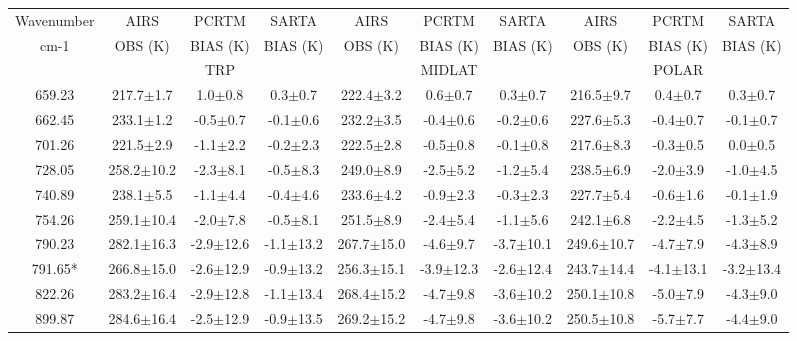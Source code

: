 \documentclass[agupp]{aguplus}              %
\begin{document}
\begin{article}
\begin{center}
\begin{table}[ht]
{\footnotesize
\hfill{}
\begin{tabular}{c|ccc|ccc|ccc} %
Wavenumber & AIRS   & PCRTM    & SARTA    & AIRS   & PCRTM    & SARTA    & AIRS   & PCRTM    & SARTA \\
cm-1       & OBS (K)& BIAS (K) & BIAS (K) & OBS (K)& BIAS (K) & BIAS (K) & OBS (K)& BIAS (K) & BIAS (K) \\
           &        & TRP      &          &        & MIDLAT   &          &        & POLAR    &       \\
\hline
659.23 & 217.7$\pm$1.7 &  1.0$\pm$0.8 &  0.3$\pm$0.7 & 222.4$\pm$3.2 &  0.6$\pm$0.7 &  0.3$\pm$0.7 & 216.5$\pm$9.7 &  0.4$\pm$0.7 &  0.3$\pm$0.7 \\ 
662.45 & 233.1$\pm$1.2 & -0.5$\pm$0.7 & -0.1$\pm$0.6 & 232.2$\pm$3.5 & -0.4$\pm$0.6 & -0.2$\pm$0.6 & 227.6$\pm$5.3 & -0.4$\pm$0.7 & -0.1$\pm$0.7 \\ 
701.26 & 221.5$\pm$2.9 & -1.1$\pm$2.2 & -0.2$\pm$2.3 & 222.5$\pm$2.8 & -0.5$\pm$0.8 & -0.1$\pm$0.8 & 217.6$\pm$8.3 & -0.3$\pm$0.5 &  0.0$\pm$0.5 \\ 
728.05 & 258.2$\pm$10.2 & -2.3$\pm$8.1 & -0.5$\pm$8.3 & 249.0$\pm$8.9 & -2.5$\pm$5.2 & -1.2$\pm$5.4 & 238.5$\pm$6.9 & -2.0$\pm$3.9 & -1.0$\pm$4.5 \\ 
740.89 & 238.1$\pm$5.5 & -1.1$\pm$4.4 & -0.4$\pm$4.6 & 233.6$\pm$4.2 & -0.9$\pm$2.3 & -0.3$\pm$2.3 & 227.7$\pm$5.4 & -0.6$\pm$1.6 & -0.1$\pm$1.9 \\ 
754.26 & 259.1$\pm$10.4 & -2.0$\pm$7.8 & -0.5$\pm$8.1 & 251.5$\pm$8.9 & -2.4$\pm$5.4 & -1.1$\pm$5.6 & 242.1$\pm$6.8 & -2.2$\pm$4.5 & -1.3$\pm$5.2 \\ 
790.23 & 282.1$\pm$16.3 & -2.9$\pm$12.6 & -1.1$\pm$13.2 & 267.7$\pm$15.0 & -4.6$\pm$9.7 & -3.7$\pm$10.1 & 249.6$\pm$10.7 & -4.7$\pm$7.9 & -4.3$\pm$8.9 \\ 
791.65* & 266.8$\pm$15.0 & -2.6$\pm$12.9 & -0.9$\pm$13.2 & 256.3$\pm$15.1 & -3.9$\pm$12.3 & -2.6$\pm$12.4 & 243.7$\pm$14.4 & -4.1$\pm$13.1 & -3.2$\pm$13.4 \\ 
\hline
822.26 & 283.2$\pm$16.4 & -2.9$\pm$12.8 & -1.1$\pm$13.4 & 268.4$\pm$15.2 & -4.7$\pm$9.8 & -3.6$\pm$10.2 & 250.1$\pm$10.8 & -5.0$\pm$7.9 & -4.3$\pm$9.0 \\ 
899.87 & 284.6$\pm$16.4 & -2.5$\pm$12.9 & -0.9$\pm$13.5 & 269.2$\pm$15.2 & -4.7$\pm$9.8 & -3.6$\pm$10.2 & 250.5$\pm$10.8 & -5.7$\pm$7.7 & -4.4$\pm$9.0 \\ 

\end{tabular}}
\end{table}
\end{center}
\end{article}
\end{document}
